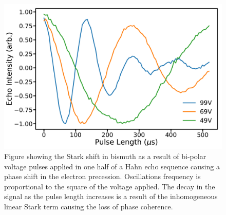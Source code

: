 \begin{figure}
\centering
\includegraphics[width=0.8\columnwidth]{Figures/BiMultiVolt.pdf}
\caption[Stark shift in Bismuth]{Figure showing the Stark shift in bismuth as a result of bi-polar voltage pulses applied in one half of a Hahn echo sequence causing a phase shift in the electron precession. Oscillations frequency is proportional to the square of the voltage applied. The decay in the signal as the pulse length increases is a result of the inhomogeneous linear Stark term causing the loss of phase coherence.}
\label{fig:biStark}
\end{figure}

